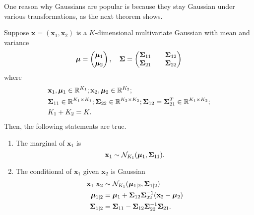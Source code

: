 One reason why Gaussians are popular is because they stay Gaussian under various transformations, as the next theorem shows.

\begin{theorem}\label{thm:ogag}
    Suppose $\mathbf{x} = (\mathbf{x}_1, \mathbf{x}_2)$ is a $K$-dimensional multivariate Gaussian with mean and variance
    \begin{equation*}
        \boldsymbol{\mu} =
        \begin{pmatrix}
            \boldsymbol{\mu}_1 \\
            \boldsymbol{\mu}_2
        \end{pmatrix}
        ,\quad
        \boldsymbol{\Sigma} =
        \begin{pmatrix}
            \boldsymbol{\Sigma}_{11} &  & \boldsymbol{\Sigma}_{12} \\
            \boldsymbol{\Sigma}_{21} &  & \boldsymbol{\Sigma}_{22} \\
        \end{pmatrix}
    \end{equation*}
    where
    \begin{align*}
        &\mathbf{x}_1, \boldsymbol{\mu}_1 \in \mathbb{R}^{K_1};
        \mathbf{x}_2, \boldsymbol{\mu}_2 \in \mathbb{R}^{K_2}; \\
        &\boldsymbol{\Sigma}_{11} \in \mathbb{R}^{K_1 \times K_1};
        \boldsymbol{\Sigma}_{22} \in \mathbb{R}^{K_2 \times K_2};
        \boldsymbol{\Sigma}_{12} = \boldsymbol{\Sigma}_{21}^{T} \in \mathbb{R}^{K_1 \times K_2}; \\
        &K_1 + K_2 = K.
    \end{align*}
    Then, the following statements are true.
    \begin{enumerate}
        \item
            The marginal of $\mathbf{x}_1$ is
            \begin{equation*}
                \mathbf{x}_{1} \sim \mathcal{N}_{K_1}(\boldsymbol{\mu}_1, \boldsymbol{\Sigma}_{11}).
            \end{equation*}

        \item
            The conditional of $\mathbf{x}_1$ given $\mathbf{x}_2$ is Gaussian
            \begin{align*}
                \mathbf{x}_1 | \mathbf{x}_2 & \sim \mathcal{N}_{K_1}(\boldsymbol{\mu}_{1 | 2}, \boldsymbol{\Sigma}_{1 | 2}) \\
                \boldsymbol{\mu}_{1 | 2} & = \boldsymbol{\mu}_1 + \boldsymbol{\Sigma}_{12} \boldsymbol{\Sigma}_{22}^{-1} (\mathbf{x}_2 - \boldsymbol{\mu}_2) \\
                \boldsymbol{\Sigma}_{1|2 } & = \boldsymbol{\Sigma}_{11} - \boldsymbol{\Sigma}_{12} \boldsymbol{\Sigma}_{22}^{-1} \boldsymbol{\Sigma}_{21}.
            \end{align*}


\end{enumerate}
\end{theorem}
